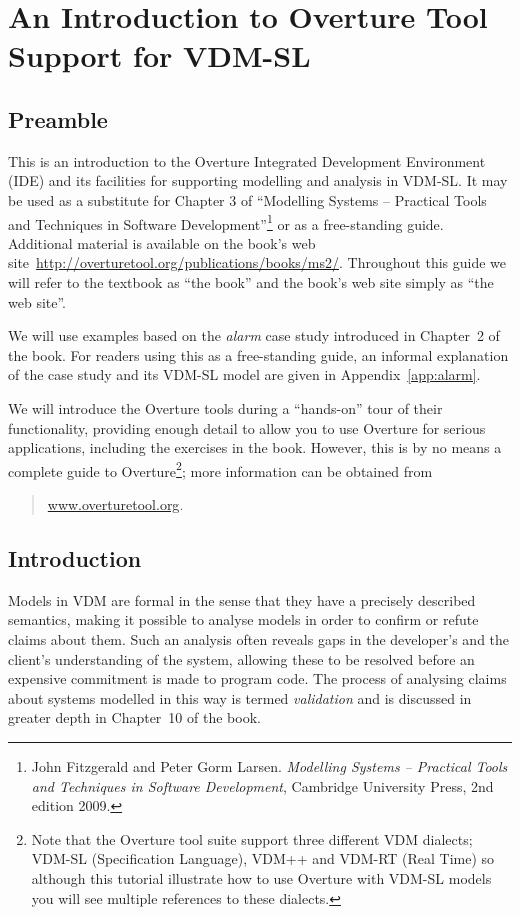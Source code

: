 \chapter{An Introduction to Overture Tool Support for VDM-SL}\label{cha:toolbox}
\initexercise

\section*{Preamble}

This is an introduction to the Overture Integrated Development Environment (IDE) and its facilities for supporting modelling and analysis in VDM-SL. It may be used as a substitute for Chapter 3 of
``Modelling Systems -- Practical Tools and Techniques in Software Development''\footnote{John Fitzgerald and Peter Gorm Larsen. \emph{Modelling Systems -- Practical Tools and Techniques in Software Development}, Cambridge University Press, 2nd edition 2009.} or as a free-standing guide. Additional material is available on the book's web site~\url{http://overturetool.org/publications/books/ms2/}. Throughout this guide we will refer to the textbook as ``the book'' and the book's web site simply as ``the web site''.

We will use examples based on the \emph{alarm} case study introduced in Chapter~2 of the book. For readers using this as a free-standing guide, an informal explanation of the case study and its
VDM-SL model are given in Appendix~\ref{app:alarm}.

We will introduce the Overture tools during a ``hands-on'' tour of their functionality, providing enough detail to allow you to use Overture for serious applications, including the exercises in the
book. However, this is by no means a complete guide to Overture\footnote{Note that the Overture tool suite support three different VDM dialects; VDM-SL (Specification Language), VDM++ and
  VDM-RT (Real Time) so although this tutorial illustrate how to use Overture with VDM-SL models you will see multiple references to these dialects.}; more information can be obtained from
%
\begin{quote}
\url{www.overturetool.org}.
\end{quote}
%
\section{Introduction}
%
Models in VDM are formal in the sense that they have a precisely described semantics, making it possible to analyse models in order to confirm or refute claims about them. Such an analysis often reveals gaps in the developer's and the client's understanding of the system,
allowing these to be resolved before an expensive commitment is made to program code. The process of analysing claims about systems modelled in this way is termed \emph{validation} and is discussed in greater depth in Chapter~10 of the book.

